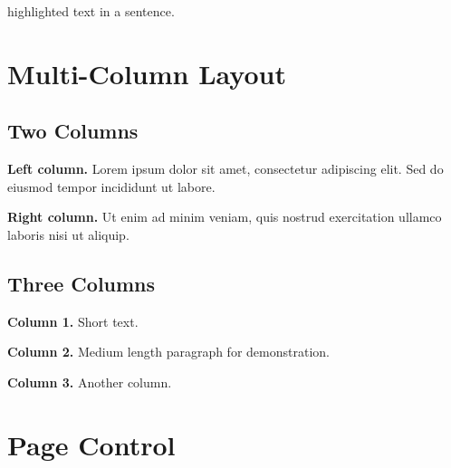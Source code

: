\documentclass[a4paper,12pt]{article}
\begin{document}
\colorbox{yellow!30}{highlighted text} in a sentence.

\section{Multi-Column Layout}


\subsection{Two Columns}

\begin{twocol}
    \textbf{Left column.} Lorem ipsum dolor sit amet, consectetur adipiscing elit. Sed do eiusmod tempor incididunt ut labore.

    \columnbreak

    \textbf{Right column.} Ut enim ad minim veniam, quis nostrud exercitation ullamco laboris nisi ut aliquip.
\end{twocol}

\subsection{Three Columns}

\begin{threecol}
    \textbf{Column 1.} Short text.

    \columnbreak

    \textbf{Column 2.} Medium length paragraph for demonstration.

    \columnbreak

    \textbf{Column 3.} Another column.
\end{threecol}

\section{Page Control}

\end{document}

